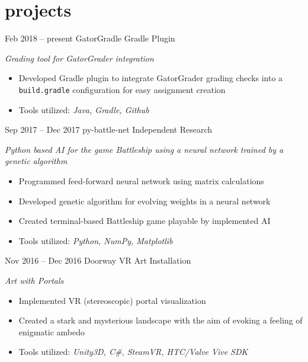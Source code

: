 \documentclass[]{friggeri-cv}
\begin{document}
\section{projects}
\begin{entrylist}
  \entry
    {Feb 2018 -- present}
    {GatorGradle}
    {Gradle Plugin}
    {\emph{Grading tool for GatorGrader integration}
    \begin{itemize}[leftmargin=1.2em]
    \item Developed Gradle plugin to integrate GatorGrader grading checks into a \texttt{build.gradle} configuration for easy assignment creation
    \item Tools utilized: \emph{Java, Gradle, Github}
    \end{itemize}}
  \entry
    {Sep 2017 -- Dec 2017}
    {py-battle-net}
    {Independent Research}
    {\emph{Python based AI for the game Battleship using a neural network trained by a genetic algorithm}
    \begin{itemize}[leftmargin=1.2em]
    \item Programmed feed-forward neural network using matrix calculations
    \item Developed genetic algorithm for evolving weights in a neural network
    \item Created terminal-based Battleship game playable by implemented AI
    \item Tools utilized: \emph{Python, NumPy, Matplotlib}
    \end{itemize}}
  \entry
    {Nov 2016 -- Dec 2016}
    {Doorway}
    {VR Art Installation}
    {\emph{Art with Portals}
    \begin{itemize}[leftmargin=1.2em]
    \item Implemented VR (stereoscopic) portal visualization
    \item Created a stark and mysterious landscape with the aim of evoking a feeling of enigmatic ambedo
    \item Tools utilized: \emph{Unity3D, C\#, SteamVR, HTC/Valve Vive SDK}
    \end{itemize}}
\end{entrylist}
\end{document}
